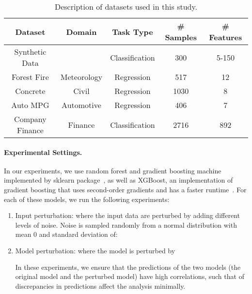 \begin{table}
 \centering
  \caption{Description of datasets used in this study.}
  \label{tab:dataset}
  \scriptsize
  \begin{tabular}{ccccc}
    \toprule
    Dataset & Domain & Task Type & \# Samples & \# Features \\
    \midrule
    Synthetic Data & & Classification & 300 & 5-150 \\
    Forest Fire & Meteorology & Regression & 517 & 12 \\
    Concrete & Civil & Regression & 1030 & 8 \\
    Auto MPG & Automotive & Regression & 406 & 7 \\
    Company Finance & Finance & Classification & 2716 & 892 \\
  \bottomrule
\end{tabular}
\end{table}

\paragraph{Experimental Settings.}
In our experiments, we use random forest and gradient boosting machine implemented by sklearn package~\cite{scikit-learn}, as well as XGBoost, an implementation of gradient boosting that uses second-order gradients and has a faster runtime~\cite{Chen:2016:XST:2939672.2939785}. For each of these models, we run the following experiments:
\begin{enumerate}
    \item Input perturbation: where the input data are perturbed by adding different levels of noise. Noise is sampled randomly from a normal distribution with mean 0 and standard deviation of:
    \item Model perturbation: where the model is perturbed by  In these experiments, we ensure that the predictions of the two models (the original model and the perturbed model) have high correlations, such that of discrepancies in predictions affect the analysis minimally. %
\end{enumerate}

